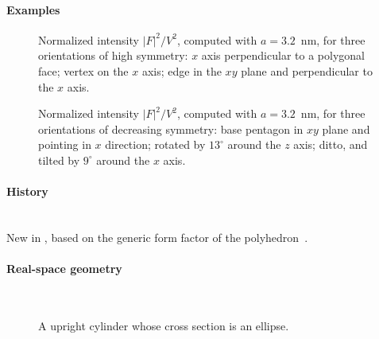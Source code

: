 \paragraph{Examples}\strut

\begin{figure}[H]
\begin{center}
\end{center}
\caption{Normalized intensity $|F|^2/V^2$,
computed with $a=3.2$~nm,
for three orientations of high symmetry:
$x$ axis perpendicular to a polygonal face;
vertex on the $x$ axis;
edge in the $xy$ plane and perpendicular to the $x$ axis.}
\end{figure}

\begin{figure}[H]
\begin{center}
\end{center}
\caption{Normalized intensity $|F|^2/V^2$,
computed with $a=3.2$~nm,
for three orientations of decreasing symmetry:
base pentagon in $xy$ plane and pointing in $x$ direction;
rotated by $13^\circ$ around the $z$ axis;
ditto, and tilted by $9^\circ$ around the $x$ axis.}
\end{figure}

\paragraph{History}\strut\\
New in ,
based on the generic form factor of the polyhedron~\cite{Wut17}.


 \label{SEllipsoidalCylinder}

\paragraph{Real-space geometry}\strut\\

\begin{figure}[H]
\hfill
{}
\hfill
{}
\hfill
{}
\hfill
\caption{A upright cylinder whose cross section is an ellipse.}
\end{figure}

